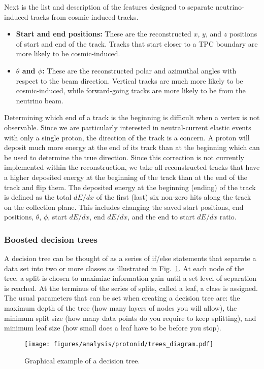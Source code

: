     Next is the list and description of the features designed to separate
    neutrino-induced tracks from cosmic-induced tracks.
    \begin{itemize}
      \item \textbf{Start and end positions:} These are the reconstructed $x$,
      $y$, and $z$ positions of start and end of the track. Tracks that start
      closer to a TPC boundary are more likely to be cosmic-induced.
      \item \textbf{$\theta$ and $\phi$:} These are the reconstructed polar and
      azimuthal angles with respect to the beam direction. Vertical tracks are
      much more likely to be cosmic-induced, while forward-going tracks are
      more likely to be from the neutrino beam.
    \end{itemize}
   
    Determining which end of a track is the beginning is difficult when a
    vertex is not observable. Since we are particularly interested in
    neutral-current elastic events with only a single proton, the direction of
    the track is a concern. A proton will deposit much more energy at the end
    of its track than at the beginning which can be used to determine the true
    direction. Since this correction is not currently implemented within the
    reconstruction, we take all reconstructed tracks that have a higher
    deposited energy at the beginning of the track than at the end of the track
    and flip them. The deposited energy at the beginning (ending) of the track
    is defined as the total $dE/dx$ of the first (last) six non-zero hits along
    the track on the collection plane.  This includes changing the saved start
    positions, end positions, $\theta$, $\phi$, start $dE/dx$, end $dE/dx$, and
    the end to start $dE/dx$ ratio.
    
  \subsubsection{Boosted decision trees}\label{sec:decisiontrees}
    A decision tree can be thought of as a series of if/else statements that
    separate a data set into two or more classes as illustrated in
    Fig.~\ref{fig:dtree}. At each node of the tree, a split is chosen to
    maximize information gain until a set level of separation is reached.  At
    the terminus of the series of splits, called a leaf, a class is assigned.
    The usual parameters that can be set when creating a decision tree are: the
    maximum depth of the tree (how many layers of nodes you will allow), the
    minimum split size (how many data points do you require to keep splitting),
    and minimum leaf size (how small does a leaf have to be before you stop). 
    \begin{figure}[ht]
      \centering
      \texttt{[image: figures/analysis/protonid/trees\_diagram.pdf]}
      \caption{Graphical example of a decision tree.}
      \label{fig:dtree}
    \end{figure}
    
